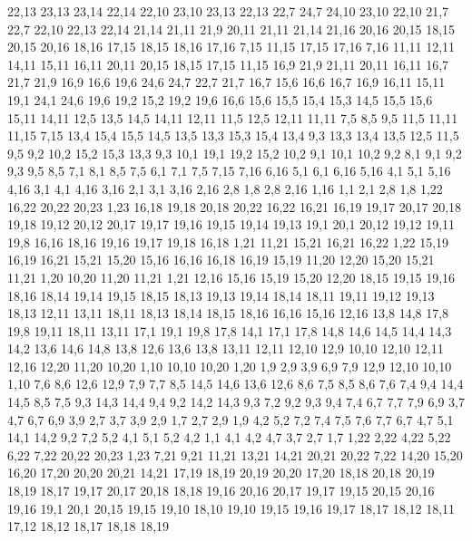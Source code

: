 22,13
23,13
23,14
22,14
%
22,10
23,10
23,13
22,13
%
22,7
24,7
24,10
23,10
22,10
%
21,7
22,7
22,10
22,13
22,14
21,14
21,11
21,9
%
20,11
21,11
21,14
21,16
20,16
20,15
%
18,15
20,15
20,16
18,16
%
17,15
18,15
18,16
17,16
%
7,15
11,15
17,15
17,16
7,16
%
11,11
12,11
14,11
15,11
16,11
20,11
20,15
18,15
17,15
11,15
%
16,9
21,9
21,11
20,11
16,11
%
16,7
21,7
21,9
16,9
%
16,6
19,6
24,6
24,7
22,7
21,7
16,7
%
15,6
16,6
16,7
16,9
16,11
15,11
%
19,1
24,1
24,6
19,6
19,2
%
15,2
19,2
19,6
16,6
15,6
15,5
15,4
15,3
%
14,5
15,5
15,6
15,11
14,11
%
12,5
13,5
14,5
14,11
12,11
%
11,5
12,5
12,11
11,11
%
7,5
8,5
9,5
11,5
11,11
11,15
7,15
%
13,4
15,4
15,5
14,5
13,5
%
13,3
15,3
15,4
13,4
%
9,3
13,3
13,4
13,5
12,5
11,5
9,5
%
9,2
10,2
15,2
15,3
13,3
9,3
%
10,1
19,1
19,2
15,2
10,2
%
9,1
10,1
10,2
9,2
%
8,1
9,1
9,2
9,3
9,5
8,5
%
7,1
8,1
8,5
7,5
%
6,1
7,1
7,5
7,15
7,16
6,16
%
5,1
6,1
6,16
5,16
%
4,1
5,1
5,16
4,16
%
3,1
4,1
4,16
3,16
%
2,1
3,1
3,16
2,16
2,8
%
1,8
2,8
2,16
1,16
%
1,1
2,1
2,8
1,8
1,22
16,22
20,22
20,23
1,23
%
16,18
19,18
20,18
20,22
16,22
16,21
16,19
%
19,17
20,17
20,18
19,18
%
19,12
20,12
20,17
19,17
19,16
19,15
19,14
19,13
%
19,1
20,1
20,12
19,12
19,11
19,8
%
16,16
18,16
19,16
19,17
19,18
16,18
%
1,21
11,21
15,21
16,21
16,22
1,22
%
15,19
16,19
16,21
15,21
15,20
%
15,16
16,16
16,18
16,19
15,19
%
11,20
12,20
15,20
15,21
11,21
%
1,20
10,20
11,20
11,21
1,21
%
12,16
15,16
15,19
15,20
12,20
%
18,15
19,15
19,16
18,16
%
18,14
19,14
19,15
18,15
%
18,13
19,13
19,14
18,14
%
18,11
19,11
19,12
19,13
18,13
%
12,11
13,11
18,11
18,13
18,14
18,15
18,16
16,16
15,16
12,16
%
13,8
14,8
17,8
19,8
19,11
18,11
13,11
%
17,1
19,1
19,8
17,8
%
14,1
17,1
17,8
14,8
14,6
14,5
14,4
14,3
14,2
%
13,6
14,6
14,8
13,8
%
12,6
13,6
13,8
13,11
12,11
12,10
12,9
%
10,10
12,10
12,11
12,16
12,20
11,20
10,20
%
1,10
10,10
10,20
1,20
%
1,9
2,9
3,9
6,9
7,9
12,9
12,10
10,10
1,10
%
7,6
8,6
12,6
12,9
7,9
7,7
%
8,5
14,5
14,6
13,6
12,6
8,6
%
7,5
8,5
8,6
7,6
%
7,4
9,4
14,4
14,5
8,5
7,5
%
9,3
14,3
14,4
9,4
%
9,2
14,2
14,3
9,3
%
7,2
9,2
9,3
9,4
7,4
%
6,7
7,7
7,9
6,9
%
3,7
4,7
6,7
6,9
3,9
%
2,7
3,7
3,9
2,9
%
1,7
2,7
2,9
1,9
%
4,2
5,2
7,2
7,4
7,5
7,6
7,7
6,7
4,7
%
5,1
14,1
14,2
9,2
7,2
5,2
%
4,1
5,1
5,2
4,2
%
1,1
4,1
4,2
4,7
3,7
2,7
1,7
1,22
2,22
4,22
5,22
6,22
7,22
20,22
20,23
1,23
%
7,21
9,21
11,21
13,21
14,21
20,21
20,22
7,22
%
14,20
15,20
16,20
17,20
20,20
20,21
14,21
%
17,19
18,19
20,19
20,20
17,20
%
18,18
20,18
20,19
18,19
%
18,17
19,17
20,17
20,18
18,18
%
19,16
20,16
20,17
19,17
%
19,15
20,15
20,16
19,16
%
19,1
20,1
20,15
19,15
19,10
%
18,10
19,10
19,15
19,16
19,17
18,17
18,12
18,11
%
17,12
18,12
18,17
18,18
18,19
